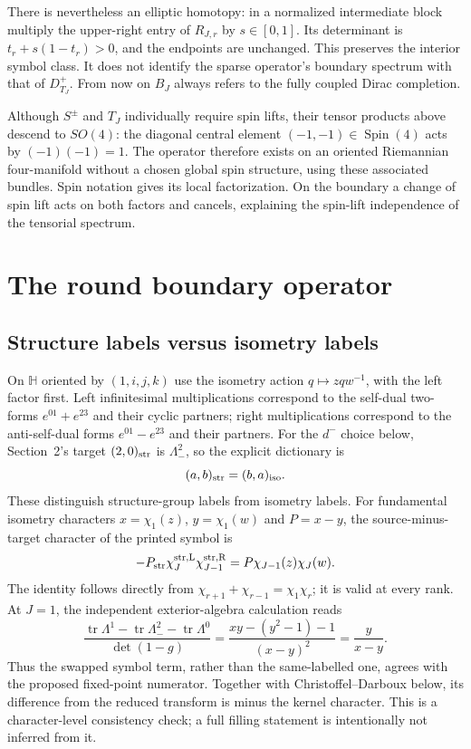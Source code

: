 \documentclass[11pt]{article}
\theoremstyle{definition}
\newcommand{\Spin}{\operatorname{Spin}}
\begin{document}
There is nevertheless an elliptic homotopy: in a normalized intermediate
block multiply the upper-right entry of $R_{J,r}$ by $s\in[0,1]$.
Its determinant is $t_r+s(1-t_r)>0$, and the endpoints are unchanged.
This preserves the interior symbol class. It does not identify the sparse
operator's boundary spectrum with that of $D^+_{T_J}$. From now on $B_J$
always refers to the fully coupled Dirac completion.

Although $S^\pm$ and $T_J$ individually require spin lifts, their tensor
products above descend to $SO(4)$: the diagonal central element
$(-1,-1)\in\Spin(4)$ acts by
$(-1)(-1)=1$. The operator therefore exists on an oriented Riemannian
four-manifold without a chosen global spin structure, using these associated
bundles. Spin notation gives its local factorization. On the boundary a
change of spin lift acts on both factors and cancels, explaining the
spin-lift independence of the tensorial spectrum.

\section{The round boundary operator}

\subsection{Structure labels versus isometry labels}
\label{sec:dictionary}
On $\mathbb H$ oriented by $(1,i,j,k)$ use the isometry action
$q\mapsto zqw^{-1}$, with the left factor first. Left infinitesimal
multiplications correspond to the self-dual two-forms
$e^{01}+e^{23}$ and their cyclic partners; right multiplications correspond
to the anti-self-dual forms $e^{01}-e^{23}$ and their partners.
For the $d^-$ choice below, Section~2's target $(2,0)_{\rm str}$ is
$\Lambda^2_-$, so the explicit dictionary is
\[
 (a,b)_{\rm str}=(b,a)_{\rm iso}.
\]
These distinguish structure-group labels from isometry labels. For fundamental
isometry characters $x=\chi_1(z)$, $y=\chi_1(w)$ and $P=x-y$, the
source-minus-target character of the printed symbol is
\[
 -P_{\rm str}\chi_J^{\rm str,L}\chi_{J-1}^{\rm str,R}
       =P\chi_{J-1}(z)\chi_J(w).
\]
The identity follows directly from
$\chi_{r+1}+\chi_{r-1}=\chi_1\chi_r$; it is valid at every rank.
At $J=1$, the independent exterior-algebra calculation reads
\[
 \frac{\operatorname{tr}\Lambda^1-\operatorname{tr}\Lambda^2_-
       -\operatorname{tr}\Lambda^0}{\det(1-g)}
 =\frac{xy-(y^2-1)-1}{(x-y)^2}=\frac y{x-y}.
\]
Thus the swapped symbol term, rather than the same-labelled one, agrees
with the proposed fixed-point numerator. Together with
Christoffel--Darboux below, its difference from the reduced transform is
minus the kernel character. This is a character-level consistency check;
a full filling statement is intentionally not inferred from it.
\end{document}
